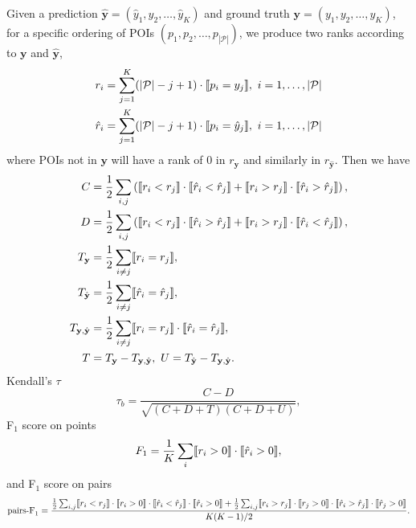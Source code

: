 Given a prediction $\hat{\mathbf{y}} = (\hat{y}_1, \hat{y}_2, \dots, \hat{y}_K)$ and ground truth $\mathbf{y} = (y_1, y_2, \dots, y_K)$,
for a specific ordering of POIs $(p_1, p_2, \dots, p_{|\mathcal{P}|})$,
we produce two ranks according to $\mathbf{y}$ and $\hat{\mathbf{y}}$,
\begin{align*}
r_i       &= \sum_{j=1}^K (| \mathcal{P} | - j + 1) \cdot \llbracket p_i = y_j \rrbracket,~
i = 1, \dots, | \mathcal{P} | \\
\hat{r}_i &= \sum_{j=1}^K (| \mathcal{P} | - j + 1) \cdot \llbracket p_i = \hat{y}_j \rrbracket,~ 
i = 1, \dots, | \mathcal{P} |
\end{align*}
where POIs not in $\mathbf{y}$ will have a rank of $0$ in $r_{\mathbf{y}}$ and similarly in $r_{\hat{\mathbf{y}}}$.
Then we have
\begin{align*}
C &= \frac{1}{2} \sum_{i,j} \left(\llbracket r_i < r_j \rrbracket \cdot \llbracket \hat{r}_i < \hat{r}_j \rrbracket +
     \llbracket r_i > r_j \rrbracket \cdot \llbracket \hat{r}_i > \hat{r}_j \rrbracket \right), \\
D &= \frac{1}{2} \sum_{i,j} \left(\llbracket r_i < r_j \rrbracket \cdot \llbracket \hat{r}_i > \hat{r}_j \rrbracket +
     \llbracket r_i > r_j \rrbracket \cdot \llbracket \hat{r}_i < \hat{r}_j \rrbracket \right), \\
T_{\mathbf{y}}       &= \frac{1}{2} \sum_{i \ne j} \llbracket r_i = r_j \rrbracket, \\
T_{\hat{\mathbf{y}}} &= \frac{1}{2} \sum_{i \ne j} \llbracket \hat{r}_i = \hat{r}_j \rrbracket, \\
T_{\mathbf{y},\hat{\mathbf{y}}} &= \frac{1}{2} \sum_{i \ne j} \llbracket r_i = r_j \rrbracket \cdot \llbracket \hat{r}_i = \hat{r}_j \rrbracket, \\
T &= T_{\mathbf{y}} - T_{\mathbf{y},\hat{\mathbf{y}}},~ U = T_{\hat{\mathbf{y}}} - T_{\mathbf{y},\hat{\mathbf{y}}}.
\end{align*}
\noindent
Kendall's $\tau$
\begin{equation*}
\tau_b = \frac{C - D}{\sqrt{(C + D + T) (C + D + U)}},
\end{equation*}
F$_1$ score on points 
\begin{equation*}
F_1 = \frac{1}{K} \sum_i \llbracket r_i > 0 \rrbracket \cdot \llbracket \hat{r}_i > 0 \rrbracket,
\end{equation*}
and F$_1$ score on pairs
\begin{equation*}
\text{pairs-F}_1 = \frac{\frac{1}{2} \sum_{i,j} 
                   \llbracket r_i < r_j \rrbracket \cdot \llbracket r_i > 0 \rrbracket \cdot
                   \llbracket \hat{r}_i < \hat{r}_j \rrbracket \cdot \llbracket \hat{r}_i > 0 \rrbracket +
                   \frac{1}{2} \sum_{i,j} 
                   \llbracket r_i > r_j \rrbracket \cdot \llbracket r_j > 0 \rrbracket \cdot
                   \llbracket \hat{r}_i > \hat{r}_j \rrbracket \cdot \llbracket \hat{r}_j > 0 \rrbracket}{K(K-1)/2}.
\end{equation*}

